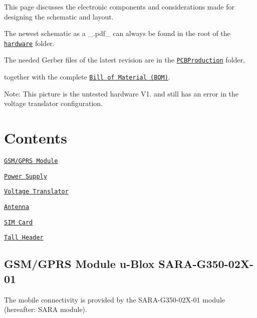 This page discusses the electronic components and considerations made for designing the schematic and layout.
\begin{DoxyItemize}
\item The newest schematic as a \+\_\+.\+pdf\+\_\+ can always be found in the root of the \href{https://github.com/itsBelinda/ENG5220-2020-Team13/tree/master/hardware}{\tt {\ttfamily hardware}} folder.
\item The needed Gerber files of the latest revision are in the \href{https://github.com/itsBelinda/ENG5220-2020-Team13/tree/master/hardware/PCBProduction}{\tt {\ttfamily P\+C\+B\+Production}} folder,
\item together with the complete \href{https://github.com/itsBelinda/ENG5220-2020-Team13/blob/master/hardware/PCBProduction/BEESAFE.BOM}{\tt {\ttfamily Bill of Material (B\+OM)}}.
\end{DoxyItemize}



Note\+: This picture is the untested hardware V1. and still has an error in the voltage translator configuration. 

\section*{Contents}


\begin{DoxyItemize}
\item \href{#gsmgprs-module-u-Blox-SARA-G350-02X-01}{\tt {\ttfamily G\+S\+M/\+G\+P\+RS Module}}
\item \href{#power-supply}{\tt {\ttfamily Power Supply}}
\item \href{#voltage-translator}{\tt {\ttfamily Voltage Translator}}
\item \href{#antenna}{\tt {\ttfamily Antenna}}
\item \href{#sim-card}{\tt {\ttfamily S\+IM Card}}
\item \href{#tall-header}{\tt {\ttfamily Tall Header}}
\end{DoxyItemize}

\subsection*{G\+S\+M/\+G\+P\+RS Module u-\/\+Blox S\+A\+R\+A-\/\+G350-\/02\+X-\/01}

The mobile connectivity is provided by the S\+A\+R\+A-\/\+G350-\/02\+X-\/01 module (hereafter\+: S\+A\+RA module).

